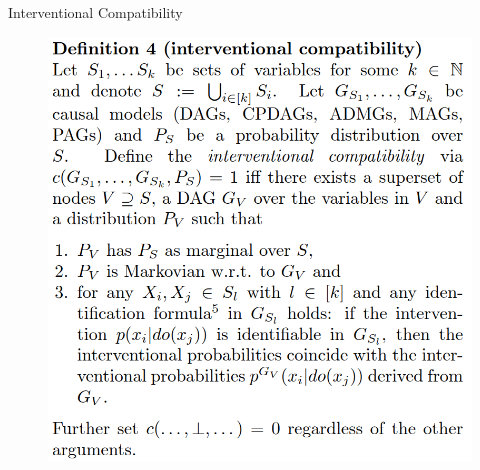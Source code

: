 \documentclass{beamer}
\begin{document}
\begin{frame}{Interventional Compatibility}
	\begin{figure}
		\centering
		\includegraphics[scale=0.25]{imgs/def4.png}
	\end{figure}
\end{frame}
\end{document}
